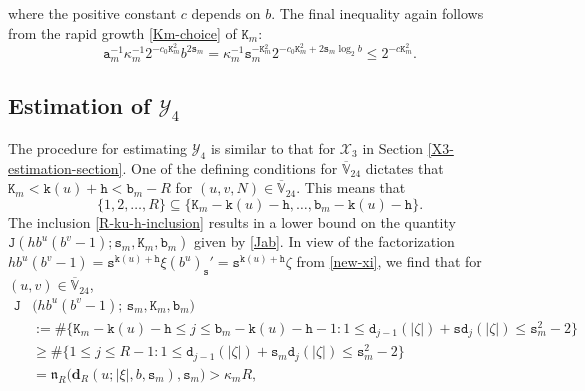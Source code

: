 \documentclass[12pt, twoside]{article}
\def\red{\color{red}}
\theoremstyle{definition}
\numberwithin{equation}{section}
\begin{document}
where the positive constant $c$ depends on $b$. The final inequality again follows from the rapid growth \eqref{Km-choice} of $\mathtt K_m$:
\[ \mathtt a_m^{-1} \kappa_m^{-1} 2^{-c_0 \mathtt K_m^2} b^{2 \mathtt s_m} = \kappa_m^{-1}  \mathtt s_m^{-\mathtt K_m^2} 2^{-c_0 \mathtt K_m^2 + 2 \mathtt s_m \log_2 b} \leq 2^{-{c} \mathtt K_m^2}. \] 
\subsection{Estimation of $\mathcal Y_4$} \label{Y4-estimation-section}
The procedure for estimating $\mathcal Y_4$ is similar to that for $\mathcal X_3$ in Section \ref{X3-estimation-section}. One of the defining conditions for $\overline{\mathbb V}_{24}$ dictates that $\mathtt K_m < \mathtt k(u) + \mathtt h < \mathtt b_m - R$ for $(u, v, N) \in \overline{\mathbb V}_{24}$. This means that
\begin{equation} \label{R-ku-h-inclusion} 
\{1, 2, \ldots, R\} \subseteq \bigl\{\mathtt K_m - \mathtt k(u) - \mathtt h, \ldots, \mathtt b_m - \mathtt k(u) - \mathtt h \bigr\}.  
\end{equation}  
The inclusion \eqref{R-ku-h-inclusion} results in a lower bound on the quantity $\mathtt J(h b^u(b^v-1); \mathtt s_m, \mathtt K_m, \mathtt b_m)$ given by \eqref{Jab}. In view of the factorization $hb^u(b^v-1) = {\mathtt s}^{\mathtt k(u) + \mathtt h} \xi (b^u)_{\mathtt s}' = \mathtt s^{\mathtt k(u) + \mathtt h} \zeta$ from \eqref{new-xi},
we find that for $(u, v) \in \overline{\mathbb V}_{24}$,
\begin{align*} 
\mathtt J &\bigl(h b^u(b^v-1); \, \mathtt s_m, \mathtt K_m, \mathtt b_m \bigr) \\  &:= \#\bigl\{\mathtt K_m - \mathtt k(u) - \mathtt h \leq j \leq \mathtt b_m -\mathtt k(u) - \mathtt h -1 : 1 \leq \mathtt d_{j-1}(|\zeta|) + \mathtt s \mathtt d_j(|\zeta|) \leq \mathtt s_m^2-2 \bigr\}  \\
&\geq \#\bigl\{1 \leq j \leq R-1: 1 \leq \mathtt d_{j-1}(|\zeta|) + \mathtt s_m \mathtt d_j(|\zeta|) \leq \mathtt s_m^2-2 \bigr\}\\ 
& = \mathfrak n_{R} \bigl(\mathbf d_R(u; {|\xi|}, b, \mathtt s_m), \mathtt s_m\bigr) > \kappa_m R, 
\end{align*} 
\end{document}
